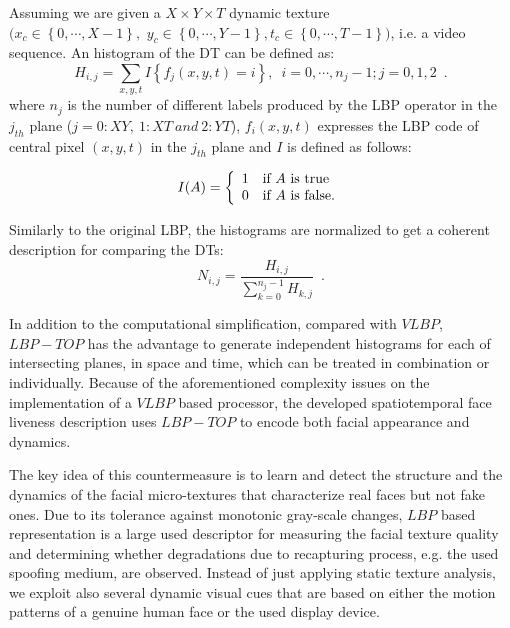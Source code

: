 Assuming we are given a $X\times Y \times T$ dynamic texture \\ $(x_c \in \left\{0,\cdots,X-1\right\},$ $y_c \in\left\{0,\cdots,Y-1\right\}, t_c\in\left\{0,\cdots,T-1\right\})$, i.e. a video sequence. An histogram of the DT can be defined as: 
\begin{equation}
H_{i,j}=\sum_{x,y,t}I\left\{f_{j}(x,y,t)=i\right\},\enspace i=0,\cdots,n_j-1;j=0,1,2 \enspace.
\end{equation}
where $n_j$ is the number of different labels produced by the LBP operator in the $j_{th}$ plane ($j=0: XY,~1: XT~and~2: YT$), $f_i(x,y,t)$ expresses the LBP code of central pixel $(x,y,t)$ in the $j_{th}$ plane and $I$ is defined as follows:

\begin{equation}
I(A) = \left\{ 
  \begin{array}{l l}
    1 &  \textrm{if $A$ is true}\\
    0 &  \textrm{if $A$ is false.}\\
  \end{array} \right.
\end{equation}


Similarly to the original LBP, the histograms are normalized to get a coherent description for comparing the DTs:
\begin{equation}
N_{i,j}=\frac{H_{i,j}}{\sum_{k=0}^{n_j-1}H_{k,j}} \enspace .
\end{equation}

In addition to the computational simplification, compared with $VLBP$, $LBP-TOP$ has the advantage to generate independent histograms for each of intersecting planes, in space and time, which can be treated in combination or individually. Because of the aforementioned complexity issues on the implementation of a $VLBP$ based processor, the developed spatiotemporal face liveness description uses $LBP-TOP$ to encode both facial appearance and dynamics. 

The key idea of this countermeasure is to learn and detect the structure and the dynamics of the facial micro-textures that characterize real faces but not fake ones. Due to its tolerance against monotonic gray-scale changes, $LBP$ based representation is a large used descriptor for measuring the facial texture quality and determining whether degradations due to recapturing process, e.g. the used spoofing medium, are observed. Instead of just applying static texture analysis, we exploit also several dynamic visual cues that are based on either the motion patterns of a genuine human face or the used display device.

